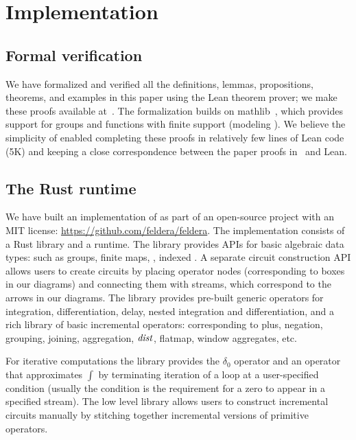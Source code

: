 \section{Implementation}\label{sec:implementation}

\subsection{Formal verification}

We have formalized and verified all the definitions, lemmas,
propositions, theorems, and examples in this paper using the Lean theorem prover; we make
these proofs available at~\cite{dbsp-theory}.
The formalization builds on mathlib~\cite{mathlib2020}, which provides
support for groups and functions with finite support (modeling
\zrs). We believe the simplicity of \dbsp enabled completing these
proofs in relatively few lines of Lean code (5K) and keeping a close
correspondence between the paper proofs in~\cite{tr} and Lean.

\subsection{The \dbsp Rust runtime}

We have built an implementation of \dbsp as part of an
open-source project with an MIT license:
\url{https://github.com/feldera/feldera}.
The implementation consists of a Rust library and a runtime.
The library provides APIs for basic algebraic data types:
such as groups, finite maps, \zr, indexed \zr.
A separate circuit construction API allows users to
create \dbsp circuits by placing operator nodes (corresponding to boxes in our diagrams)
and connecting them with streams, which correspond to the
arrows in our diagrams.  The library provides pre-built generic operators
for integration, differentiation, delay, nested integration and differentiation,
and a rich library of \zr basic incremental operators:
corresponding to plus, negation, grouping, joining, aggregation, $\mathit{dist}$,
flatmap, window aggregates, etc.

For iterative computations the library provides the $\delta_0$ operator and
an operator that approximates $\int$ by terminating iteration of
a loop at a user-specified condition (usually the condition is the
requirement for a zero to appear in a specified stream).
The low level library allows users to construct incremental
circuits manually by stitching together incremental versions of primitive operators.

